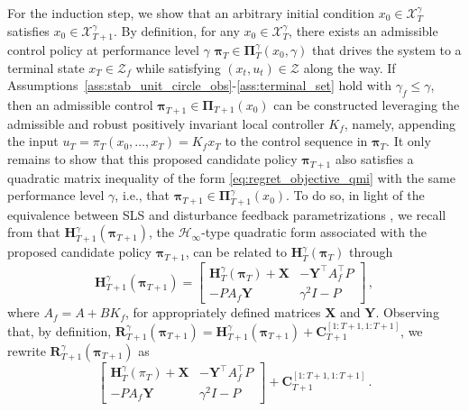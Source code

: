 \documentclass[conference]{IEEEtran}
\begin{document}
    For the induction step, we show that an arbitrary initial condition $x_0 \in \mathcal{X}_T^\gamma$ satisfies $x_0 \in \mathcal{X}_{T+1}^\gamma$. By definition, for any $x_0 \in \mathcal{X}_T^\gamma$, there exists an admissible control policy at performance level $\gamma$ $\bm{\pi}_T \in \bm{\Pi}_{T}^\gamma(x_0, \gamma)$ that drives the system to a terminal state $x_T \in \mathcal{Z}_f$ while satisfying $(x_t, u_t) \in \mathcal{Z}$ along the way. If Assumptions~\ref{ass:stab_unit_circle_obs}-\ref{ass:terminal_set} hold with $\gamma_f \leq \gamma$, then an admissible control $\bm{\pi}_{T+1} \in \bm{\Pi}_{T+1}(x_0)$ can be constructed leveraging the admissible and robust positively invariant local controller $K_f$, namely, appending the input $u_T = \pi_T(x_0, \dots, x_T) = K_f x_T$ to the control sequence in $\bm{\pi}_T$. It only remains to show that this proposed candidate policy $\bm{\pi}_{T+1}$ also satisfies a quadratic matrix inequality of the form \eqref{eq:regret_objective_qmi} with the same performance level $\gamma$, i.e., that $\bm{\pi}_{T+1} \in \bm{\Pi}_{T+1}^\gamma(x_0)$. To do so, in light of the equivalence between SLS and disturbance feedback parametrizations \cite{zheng2020equivalence}, we recall from \cite[Prop. 3]{goulart2009control} that $\mathbf{H}_{T+1}^\gamma(\bm{\pi}_{T+1})$, the $\mathcal{H}_\infty$-type quadratic form associated with the proposed candidate policy $\bm{\pi}_{T+1}$, can be related to $\mathbf{H}_T^\gamma(\bm{\pi}_T)$ through
    \begin{equation*}
        \mathbf{H}_{T+1}^\gamma(\bm{\pi}_{T+1}) = \begin{bmatrix}
            \mathbf{H}_T^\gamma(\bm{\pi}_T) + \mathbf{X} & -\mathbf{Y}^\top A_f^\top P\\
            - P A_f \mathbf{Y} & \gamma^2 I - P
        \end{bmatrix}\,,
    \end{equation*}
    where $A_f = A + BK_f$, for appropriately defined matrices $\mathbf{X}$ and $\mathbf{Y}$. Observing that, by definition, $\mathbf{R}_{T+1}^\gamma(\bm{\pi}_{T+1}) = \mathbf{H}_{T+1}^\gamma(\bm{\pi}_{T+1}) + \mathbf{C}_{T+1}^{[1:T+1, 1:T+1]}$, we rewrite $\mathbf{R}_{T+1}^\gamma(\bm{\pi}_{T+1})$ as
    \begin{equation*}
        \begin{bmatrix}
            \mathbf{H}_T^\gamma(\pi_T) + \mathbf{X} & -\mathbf{Y}^\top A_f^\top P\\
            -P A_f \mathbf{Y} & \gamma^2 I - P
        \end{bmatrix} + \mathbf{C}_{T+1}^{[1:T+1, 1:T+1]}\,.
    \end{equation*}
\end{document}
